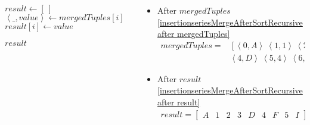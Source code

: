 \begin{frame}[containsverbatim]{\insertionseriesexampleframe}
\begin{columns}[c]
\begin{column}{0.45\textwidth}
{\begin{minipage}[c]{\textwidth}
\begin{algorithm}[H]
\begin{algorithmic}[1]
                                            \State $result \gets \left[\ \right]$
                                                \State $\left<\_, value\right> \gets mergedTuples{\left[i\right]}$
                                                \State $result{\left[i\right]} \gets value$
                                            \EndFor
                                            \label{insertionseriesMergeAfterSortRecursive after result}
                        
                                            \State \Return $result$
                                        \EndFunction
                                    \end{algorithmic}
                                \end{algorithm}
                            \endgroup
                        \end{minipage}
                    }
                \end{column}

                \begin{column}{0.55\textwidth}
                    \scriptsize
                    \begin{itemize}
                        \item After $mergedTuples$ \cref{insertionseriesMergeAfterSortRecursive after mergedTuples}
                        \begin{align*}
                            mergedTuples = & \left[\left<0, A\right> \ \left<1, 1\right> \ \left<2, 2\right> \ \left<3, 3\right>\right. \\ 
                            & \left.\left<4, D\right> \ \left<5, 4\right> \ \left<6, F\right> \ \left<7, 5\right> \ \left<8, I\right>\right]
                        \end{align*}

                        \item After $result$ \cref{insertionseriesMergeAfterSortRecursive after result}
                        \begin{align*}
                            result = \begin{bmatrix}A & 1 & 2 & 3 & D & 4 & F & 5 & I\end{bmatrix}
                        \end{align*}
                    \end{itemize}
                \end{column}
            \end{columns}
        \end{frame}


